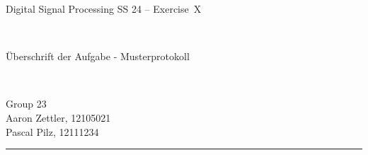 \documentclass[12pt,a4paper,austrian]{article}
\begin{document}
\pagestyle{plain}


\thispagestyle{empty}
\noindent
\begin{minipage}[b][4cm]{1.0\textwidth}  
\begin{center}
\begin{bf} 
\begin{large} Digital Signal Processing SS 24 -- Exercise~X\end{large} \\
\vspace{0.3cm}
\begin{Large} Überschrift der Aufgabe - Musterprotokoll  \end{Large} \\
\vspace{0.3cm}
\end{bf}
\begin{large} 
Group 23\\
Aaron Zettler, 12105021\\
Pascal Pilz, 12111234\\
\end{large} 
\end{center}
\end{minipage}

\noindent \rule[0.8em]{\textwidth}{0.12mm}\\[-0.5em]
\end{document}
